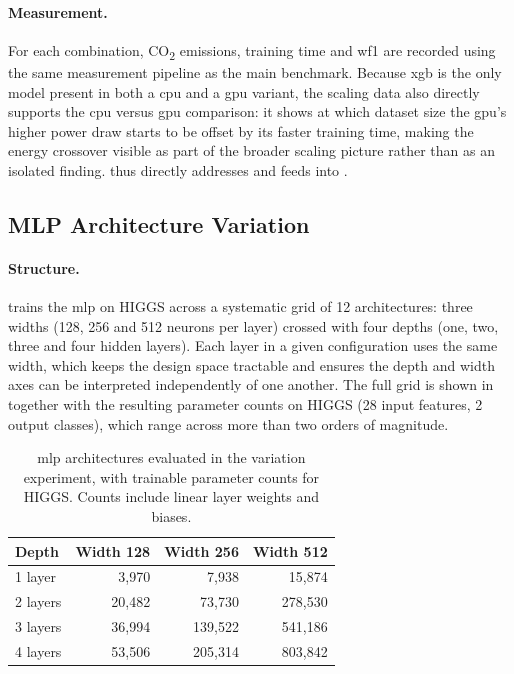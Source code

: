 \paragraph{Measurement.}
For each combination, CO\textsubscript{2} emissions, training time and \gls{wf1} are recorded using the same measurement pipeline as the main benchmark. Because \gls{xgb} is the only model present in both a \gls{cpu} and a \gls{gpu} variant, the scaling data also directly supports the \gls{cpu} versus \gls{gpu} comparison: it shows at which dataset size the \gls{gpu}'s higher power draw starts to be offset by its faster training time, making the energy crossover visible as part of the broader scaling picture rather than as an isolated finding.  thus directly addresses  and feeds into .


\subsection{MLP Architecture Variation}
\label{design_mlp_variation}

\paragraph{Structure.}
 trains the \gls{mlp} on HIGGS across a systematic grid of 12 architectures: three widths (128, 256 and 512 neurons per layer) crossed with four depths (one, two, three and four hidden layers). Each layer in a given configuration uses the same width, which keeps the design space tractable and ensures the depth and width axes can be interpreted independently of one another. The full grid is shown in  together with the resulting parameter counts on HIGGS (28 input features, 2 output classes), which range across more than two orders of magnitude.

\begin{table}[htbp]
\centering
\caption[\gls{mlp} architecture variation: configurations and parameter counts.]{\gls{mlp} architectures evaluated in the variation experiment, with trainable parameter counts for HIGGS. Counts include linear layer weights and biases.}
\label{tab:mlp_architectures}
\begin{tabular}{lrrr}
\toprule
\textbf{Depth} & \textbf{Width 128} & \textbf{Width 256} & \textbf{Width 512} \\
\midrule
1 layer  &   3{,}970 &   7{,}938 &  15{,}874 \\
2 layers &  20{,}482 &  73{,}730 & 278{,}530 \\
3 layers &  36{,}994 & 139{,}522 & 541{,}186 \\
4 layers &  53{,}506 & 205{,}314 & 803{,}842 \\
\bottomrule
\end{tabular}
\end{table}

